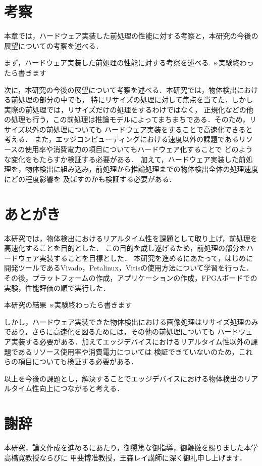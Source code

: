 \documentclass[11pt,a4j]{jreport}
\begin{document}
%
\chapter{考察}
本章では，ハードウェア実装した前処理の性能に対する考察と，本研究の今後の展望についての考察を述べる．

まず，ハードウェア実装した前処理の性能に対する考察を述べる.
※実験終わったら書きます

次に，本研究の今後の展望について考察を述べる．本研究では，物体検出における前処理の部分の中でも，
特にリサイズの処理に対して焦点を当てた．しかし実際の前処理では，リサイズだけの処理をするわけではなく，
正規化などの他の処理も行う，この前処理は推論モデルによってまちまちである．そのため，リサイズ以外の前処理についても
ハードウェア実装をすることで高速化できると考える．
また，エッジコンピューティングにおける速度以外の課題であるリソースの使用率や消費電力の項目についてもハードウェア化することで
どのような変化をもたらすか検証する必要がある．
加えて，ハードウェア実装した前処理を，物体検出に組み込み，前処理から推論処理までの物体検出全体の処理速度にどの程度影響を
及ぼすのかも検証する必要がある．
\chapter{あとがき}
本研究では，物体検出におけるリアルタイム性を課題として取り上げ，前処理を高速化することを目的とした．
この目的を成し遂げるため，前処理の部分をハードウェア実装することを目標とした．
本研究を進めるにあたって，はじめに開発ツールであるVivado，Petalinux，Vitisの使用方法について学習を行った．
その後，プラットフォームの作成，アプリケーションの作成，FPGAボードでの実験，性能評価の順で実行した．

本研究の結果
※実験終わったら書きます

しかし，ハードウェア実装できた物体検出における画像処理はリサイズ処理のみであり，さらに高速化を図るためには，その他の前処理についても
ハードウェア実装する必要がある．加えてエッジデバイスにおけるリアルタイム性以外の課題であるリソース使用率や消費電力については
検証できていないのため，これらの項目についても検証する必要がある．

以上を今後の課題とし，解決することでエッジデバイスにおける物体検出のリアルタイム性向上につながると考える．

\chapter*{謝辞} %
本研究，論文作成を進めるにあたり，御懇篤な御指導，御鞭撻を賜りました本学高橋寛教授ならびに
甲斐博准教授，王森レイ講師に深く御礼申し上げます．
\end{document}
